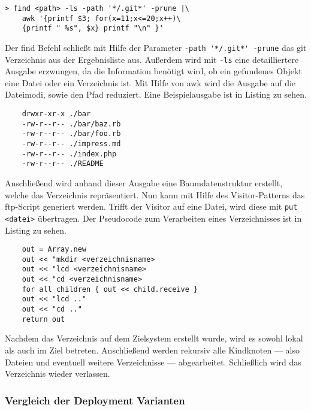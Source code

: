 \begin{lstlisting}
> find <path> -ls -path '*/.git*' -prune |\
	awk '{printf $3; for(x=11;x<=20;x++)\
	{printf " %s", $x} printf "\n" }'
\end{lstlisting}

Der find Befehl schließt mit Hilfe der Parameter \lstinline!-path '*/.git*' -prune! das git Verzeichnis aus der Ergebnisliste aus. Außerdem wird mit \lstinline!-ls! eine detailliertere Ausgabe erzwungen, da die Information benötigt wird, ob ein gefundenes Objekt eine Datei oder ein Verzeichnis ist. Mit Hilfe von awk wird die Ausgabe auf die Dateimodi, sowie den Pfad reduziert. Eine Beispielausgabe ist in Listing  zu sehen.

\begin{lstlisting}
	drwxr-xr-x ./bar
	-rw-r--r-- ./bar/baz.rb
	-rw-r--r-- ./bar/foo.rb
	-rw-r--r-- ./impress.md
	-rw-r--r-- ./index.php
	-rw-r--r-- ./README
\end{lstlisting}
     
Anschließend wird anhand dieser Ausgabe eine Baumdatenstruktur erstellt, welche das Verzeichnis repräsentiert. Nun kann mit Hilfe des Visitor-Patterns das \gls{ftp}-Script generiert werden. Trifft der Visitor auf eine Datei, wird diese mit \lstinline!put <datei>! übertragen. Der Pseudocode zum Verarbeiten eines Verzeichnisses ist in Listing  zu sehen.

\begin{lstlisting}
	out = Array.new
	out << "mkdir <verzeichnisname>
	out << "lcd <verzeichnisname>
	out << "cd <verzeichnisname>
	for all children { out << child.receive }
	out << "lcd .."
	out << "cd .."
	return out
\end{lstlisting}

Nachdem das Verzeichnis auf dem Zielsystem erstellt wurde, wird es sowohl lokal als auch im Ziel betreten. Anschließend werden rekursiv alle Kindknoten — also Dateien und eventuell weitere Verzeichnisse — abgearbeitet. Schließlich wird das Verzeichnis wieder verlassen.


\subsubsection{Vergleich der Deployment Varianten} %
\label{ssub:vergleich_der_deployment_varianten}

